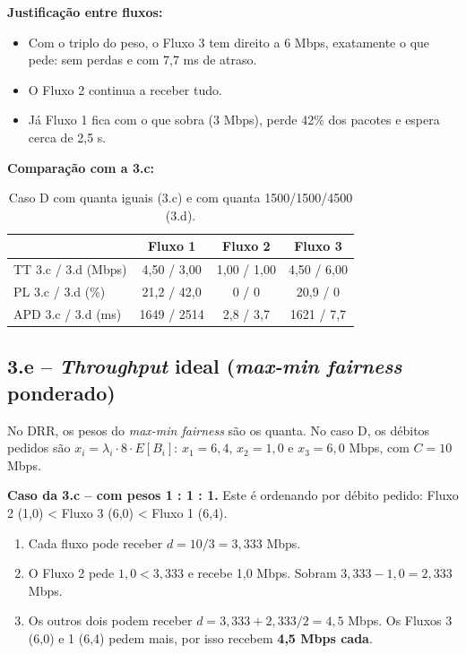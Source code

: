\documentclass[11pt,a4paper]{article}
\begin{document}
\textbf{Justificação entre fluxos:}
\begin{itemize}
  \item Com o triplo do peso, o Fluxo 3 tem direito a 6 Mbps, exatamente o que pede: sem perdas e com 7,7 ms de atraso.
  \item O Fluxo 2 continua a receber tudo. 
  \item Já Fluxo 1 fica com o que sobra (3 Mbps), perde 42\% dos pacotes e espera cerca de 2,5 s.
\end{itemize}

\textbf{Comparação com a 3.c:}

\begin{table}[H]
\centering
\caption{Caso D com quanta iguais (3.c) e com quanta 1500/1500/4500 (3.d).}
\begin{tabular}{lccc}
\toprule
 & Fluxo 1 & Fluxo 2 & Fluxo 3 \\
\midrule
TT 3.c / 3.d (Mbps)  & 4,50 / 3,00 & 1,00 / 1,00 & 4,50 / 6,00 \\
PL 3.c / 3.d (\%)    & 21,2 / 42,0 & 0 / 0 & 20,9 / 0 \\
APD 3.c / 3.d (ms)   & 1649 / 2514 & 2,8 / 3,7 & 1621 / 7,7 \\
\bottomrule
\end{tabular}
\end{table}


\subsection{3.e -- \textit{Throughput} ideal (\textit{max-min fairness} ponderado)}

No DRR, os pesos do \textit{max-min fairness} são os quanta.
No caso D, os débitos pedidos são $x_i = \lambda_i \cdot 8 \cdot E[B_i]$: $x_1 = 6{,}4$, $x_2 = 1{,}0$ e $x_3 = 6{,}0$ Mbps, com $C = 10$ Mbps.

\textbf{Caso da 3.c -- com pesos 1 : 1 : 1.} Este é ordenando por débito pedido: Fluxo 2 (1,0) < Fluxo 3 (6,0) < Fluxo 1 (6,4).
\begin{enumerate}
  \item Cada fluxo pode receber $d = 10/3 = 3{,}333$ Mbps.
  \item O Fluxo 2 pede $1{,}0 < 3{,}333$ e recebe 1,0 Mbps. Sobram $3{,}333 - 1{,}0 = 2{,}333$ Mbps.
  \item Os outros dois podem receber $d = 3{,}333 + 2{,}333/2 = 4{,}5$ Mbps. Os Fluxos 3 (6,0) e 1 (6,4) pedem mais, por isso recebem \textbf{4,5 Mbps cada}.
\end{enumerate}
\end{document}

